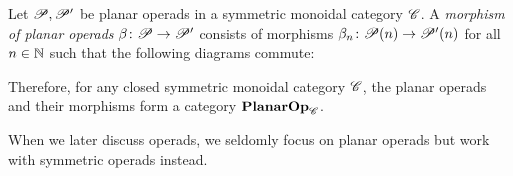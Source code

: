     \begin{defin}
        Let $\P, \P'$ be planar operads in a symmetric monoidal category $\C$. A
        {\em morphism of planar operads} $\beta \colon \P \to \P'$ consists of
        morphisms $\beta_n \colon \P(n) \to \P'(n)$ for all $n \in \N$ such that
        the following diagrams commute:
        \begin{center}
        \end{center}
        \begin{center}
        \end{center}
    \end{defin}
    Therefore, for any closed symmetric monoidal category $\C$, the planar
    operads and their morphisms form a category $\Plop_{\C}$.

    \medskip

    When we later discuss operads, we seldomly focus on planar operads but
    work with symmetric operads instead.

